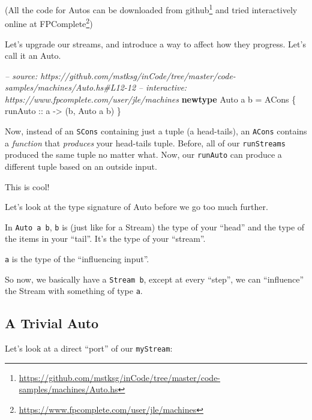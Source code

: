 \documentclass[]{article}
\newenvironment{Shaded}{}{}
\newcommand{\KeywordTok}[1]{\textcolor[rgb]{0.00,0.44,0.13}{\textbf{{#1}}}}
\newcommand{\DataTypeTok}[1]{\textcolor[rgb]{0.56,0.13,0.00}{{#1}}}
\newcommand{\CommentTok}[1]{\textcolor[rgb]{0.38,0.63,0.69}{\textit{{#1}}}}
\newcommand{\OtherTok}[1]{\textcolor[rgb]{0.00,0.44,0.13}{{#1}}}
\newcommand{\FunctionTok}[1]{\textcolor[rgb]{0.02,0.16,0.49}{{#1}}}
\newcommand{\NormalTok}[1]{{#1}}
\renewcommand{\href}[2]{#2\footnote{\url{#1}}}
\begin{document}
(All the code for Autos can be downloaded
\href{https://github.com/mstksg/inCode/tree/master/code-samples/machines/Auto.hs}{from
github} and tried interactively online
\href{https://www.fpcomplete.com/user/jle/machines}{at FPComplete})

Let's upgrade our streams, and introduce a way to affect how they progress.
Let's call it an Auto.

\begin{Shaded}
\begin{Highlighting}[]
\CommentTok{-- source: https://github.com/mstksg/inCode/tree/master/code-samples/machines/Auto.hs#L12-12}
\CommentTok{-- interactive: https://www.fpcomplete.com/user/jle/machines}
\KeywordTok{newtype} \DataTypeTok{Auto} \NormalTok{a b }\FunctionTok{=} \DataTypeTok{ACons} \NormalTok{\{}\OtherTok{ runAuto ::} \NormalTok{a }\OtherTok{->} \NormalTok{(b, }\DataTypeTok{Auto} \NormalTok{a b) \}}
\end{Highlighting}
\end{Shaded}

Now, instead of an \texttt{SCons} containing just a tuple (a head-tails), an
\texttt{ACons} contains a \emph{function} that \emph{produces} your head-tails
tuple. Before, all of our \texttt{runStreams} produced the same tuple no matter
what. Now, our \texttt{runAuto} can produce a different tuple based on an
outside input.

This is cool!

Let's look at the type signature of Auto before we go too much further.

In \texttt{Auto\ a\ b}, \texttt{b} is (just like for a Stream) the type of your
``head'' and the type of the items in your ``tail''. It's the type of your
``stream''.

\texttt{a} is the type of the ``influencing input''.

So now, we basically have a \texttt{Stream\ b}, except at every ``step'', we can
``influence'' the Stream with something of type \texttt{a}.

\subsection{A Trivial Auto}\label{a-trivial-auto}

Let's look at a direct ``port'' of our \texttt{myStream}:
\end{document}
